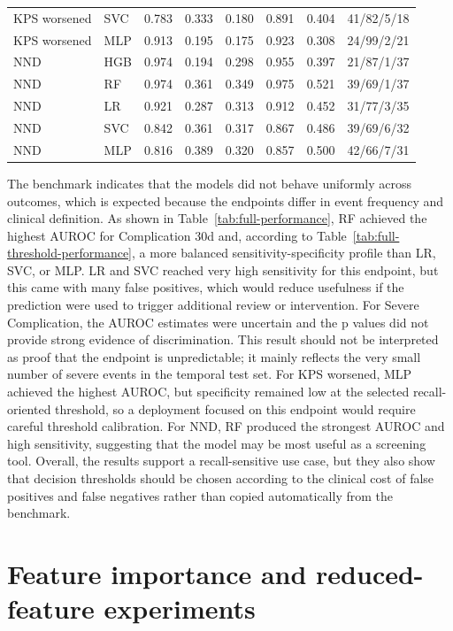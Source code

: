 \documentclass[11pt,a4paper]{article}
\begin{document}
\begin{longtable}{p{3.0cm}p{1.4cm}rrrrrp{2.4cm}}
KPS worsened & SVC & 0.783 & 0.333 & 0.180 & 0.891 & 0.404 & 41/82/5/18 \\
KPS worsened & MLP & 0.913 & 0.195 & 0.175 & 0.923 & 0.308 & 24/99/2/21 \\
\addlinespace
NND & HGB & 0.974 & 0.194 & 0.298 & 0.955 & 0.397 & 21/87/1/37 \\
NND & RF & 0.974 & 0.361 & 0.349 & 0.975 & 0.521 & 39/69/1/37 \\
NND & LR & 0.921 & 0.287 & 0.313 & 0.912 & 0.452 & 31/77/3/35 \\
NND & SVC & 0.842 & 0.361 & 0.317 & 0.867 & 0.486 & 39/69/6/32 \\
NND & MLP & 0.816 & 0.389 & 0.320 & 0.857 & 0.500 & 42/66/7/31 \\
\bottomrule
\end{longtable}
\endgroup

The benchmark indicates that the models did not behave uniformly across outcomes, which is expected because the endpoints differ in event frequency and clinical definition. As shown in Table~\ref{tab:full-performance}, RF achieved the highest AUROC for Complication 30d and, according to Table~\ref{tab:full-threshold-performance}, a more balanced sensitivity-specificity profile than LR, SVC, or MLP. LR and SVC reached very high sensitivity for this endpoint, but this came with many false positives, which would reduce usefulness if the prediction were used to trigger additional review or intervention. For Severe Complication, the AUROC estimates were uncertain and the p values did not provide strong evidence of discrimination. This result should not be interpreted as proof that the endpoint is unpredictable; it mainly reflects the very small number of severe events in the temporal test set. For KPS worsened, MLP achieved the highest AUROC, but specificity remained low at the selected recall-oriented threshold, so a deployment focused on this endpoint would require careful threshold calibration. For NND, RF produced the strongest AUROC and high sensitivity, suggesting that the model may be most useful as a screening tool. Overall, the results support a recall-sensitive use case, but they also show that decision thresholds should be chosen according to the clinical cost of false positives and false negatives rather than copied automatically from the benchmark.

\section{Feature importance and reduced-feature experiments}
\end{document}
